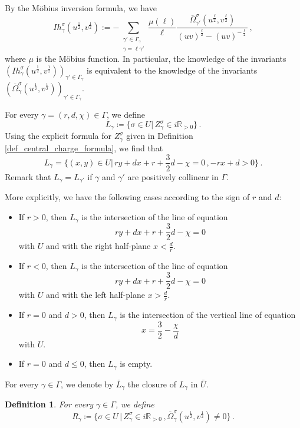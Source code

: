 \documentclass[12pt, a4paper]{amsart}
\newtheorem{defn}{Definition}[section]
\newcommand\R{\mathbb R}
\begin{document}
By the Möbius inversion formula, we have 
\[Ih_{\gamma}^\sigma(u^{\frac{1}{2}}, v^{\frac{1}{2}})
:=-\sum_{\substack{\gamma' \in \Gamma_\gamma\\ \gamma=\ell \gamma'}}
\frac{\mu(\ell)}{\ell}
\frac{\overline{\Omega}_{\gamma'}^\sigma(u^{\frac{\ell}{2}}, v^{\frac{\ell}{2}})}{
(uv)^{\frac{\ell}{2}}-(uv)^{-\frac{\ell}{2}}}\,,\]
where $\mu$ is the Möbius function. In particular, the knowledge of the invariants
$(Ih_{\gamma}^\sigma(u^{\frac{1}{2}}, v^{\frac{1}{2}}))_{\gamma'\in \Gamma_\gamma}$
is equivalent to the knowledge of the invariants 
$(\overline{\Omega}_\gamma^\sigma(u^{\frac{1}{2}}, v^{\frac{1}{2}}))_{\gamma'\in \Gamma_\gamma}$.

For every $\gamma =(r,d,\chi) \in \Gamma$, we define
\[L_\gamma \coloneq \{ \sigma \in U| \, Z_{\gamma}^{\sigma} \in i \R_{>0} \}\,.\]
Using the explicit formula for $Z_\gamma^\sigma$ given in Definition 
\ref{def_central_charge_formula}, we find that
\[L_\gamma
=\{(x,y) \in U |\, ry+dx+r+\frac{3}{2}d-\chi=0 \,, -rx+d>0 \}\,.\]
Remark that $L_\gamma = L_{\gamma'}$ if $\gamma$ and $\gamma'$
are positively collinear in $\Gamma$.

More explicitly, we have
the following cases according to the sign of $r$ and $d$:
\begin{itemize}
    \item[(i)] If $r > 0$, then $L_\gamma$ is the intersection of the line of 
equation 
\[ry+dx+r+\frac{3}{2}d-\chi=0\] with $U$ and with the right half-plane $x < \frac{d}{r}$.
    \item[(ii)] If $r<0$, then $L_\gamma$ is the intersection of the line of equation 
\[ry+dx+r+\frac{3}{2}d-\chi=0\] 
with $U$ and with the left half-plane 
$x> \frac{d}{r}$.
   \item[(iii)] If $r=0$ and $d>0$, then $L_\gamma$ is the intersection of the vertical line of equation
\[x=\frac{3}{2}-\frac{\chi}{d}\]
with $U$.
   \item[(iv)] If $r=0$ and $d \leqslant 0$, then $L_\gamma$ is empty.
\end{itemize}

For every $\gamma \in \Gamma$, we denote by $\bar{L}_\gamma$ the closure of $L_\gamma$ in $\bar{U}$.


\begin{defn}
For every $\gamma \in \Gamma$, we define 
\[R_\gamma \coloneqq \{ \sigma \in U \,| \, Z_\gamma^{\sigma} \in i \R_{>0} \,,
\overline{\Omega}_\gamma^\sigma(u^{\frac{1}{2}},v^{\frac{1}{2}}) \neq 0 \}\,. \]
\end{defn}
\end{document}
